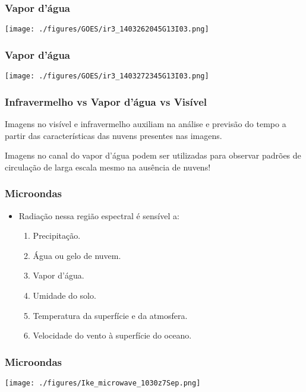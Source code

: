 \begin{frame}
\frametitle{Vapor d'água}
  \begin{center}
    \texttt{[image: ./figures/GOES/ir3\_1403262045G13I03.png]}
  \end{center}
\end{frame}


\begin{frame}
\frametitle{Vapor d'água}
  \begin{center}
    \texttt{[image: ./figures/GOES/ir3\_1403272345G13I03.png]}
  \end{center}
\end{frame}


\begin{frame}
\frametitle{Infravermelho vs Vapor d'água vs Visível}
  \begin{block}{}
    Imagens no visível e infravermelho auxiliam na análise e previsão do tempo a
    partir das características das nuvens presentes nas imagens.
  \end{block}
  \pause
  \begin{block}{}
    Imagens no canal do vapor d'água podem ser utilizadas para observar padrões
    de circulação de larga escala mesmo na ausência de nuvens!
  \end{block}
\end{frame}


\begin{frame}
\frametitle{Microondas}
  \begin{itemize}[<+-| alert@+>]
    \item Radiação nessa região espectral é sensível a:
      \begin{enumerate}
        \item Precipitação.
        \item Água ou gelo de nuvem.
        \item Vapor d'água.
        \item Umidade do solo.
        \item Temperatura da superfície e da atmosfera.
        \item Velocidade do vento à superfície do oceano.
      \end{enumerate}
  \end{itemize}
\end{frame}


\begin{frame}
\frametitle{Microondas}
  \begin{center}
    \texttt{[image: ./figures/Ike\_microwave\_1030z7Sep.png]}
  \end{center}
\end{frame}


